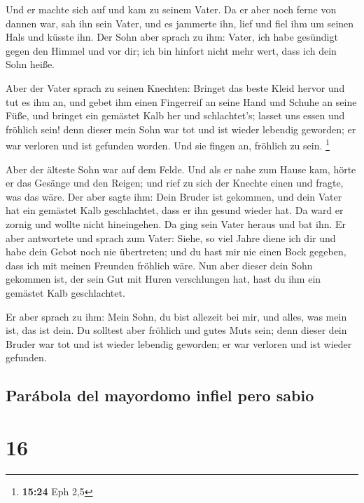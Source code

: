  Und er machte sich auf und kam zu seinem Vater. Da er
aber noch ferne von dannen war, sah ihn sein Vater, und es jammerte ihn,
lief und fiel ihm um seinen Hals und küsste ihn.  Der
Sohn aber sprach zu ihm: Vater, ich habe gesündigt gegen den Himmel und
vor dir; ich bin hinfort nicht mehr wert, dass ich dein Sohn heiße.

 Aber der Vater sprach zu seinen Knechten: Bringet das
beste Kleid hervor und tut es ihm an, und gebet ihm einen Fingerreif an
seine Hand und Schuhe an seine Füße,  und bringet ein
gemästet Kalb her und schlachtet's; lasset uns essen und fröhlich sein!
 denn dieser mein Sohn war tot und ist wieder lebendig
geworden; er war verloren und ist gefunden worden. Und sie fingen an,
fröhlich zu sein. \footnote{\textbf{15:24} Eph 2,5}

 Aber der älteste Sohn war auf dem Felde. Und als er nahe
zum Hause kam, hörte er das Gesänge und den Reigen;  und
rief zu sich der Knechte einen und fragte, was das wäre. 
Der aber sagte ihm: Dein Bruder ist gekommen, und dein Vater hat ein
gemästet Kalb geschlachtet, dass er ihn gesund wieder hat.
 Da ward er zornig und wollte nicht hineingehen. Da ging
sein Vater heraus und bat ihn.  Er aber antwortete und
sprach zum Vater: Siehe, so viel Jahre diene ich dir und habe dein Gebot
noch nie übertreten; und du hast mir nie einen Bock gegeben, dass ich
mit meinen Freunden fröhlich wäre.  Nun aber dieser dein
Sohn gekommen ist, der sein Gut mit Huren verschlungen hat, hast du ihm
ein gemästet Kalb geschlachtet.

 Er aber sprach zu ihm: Mein Sohn, du bist allezeit bei
mir, und alles, was mein ist, das ist dein.  Du solltest
aber fröhlich und gutes Muts sein; denn dieser dein Bruder war tot und
ist wieder lebendig geworden; er war verloren und ist wieder gefunden.

\hypertarget{paruxe1bola-del-mayordomo-infiel-pero-sabio}{%
\subsection{Parábola del mayordomo infiel pero
sabio}\label{paruxe1bola-del-mayordomo-infiel-pero-sabio}}

\hypertarget{section-15}{%
\section{16}\label{section-15}}

